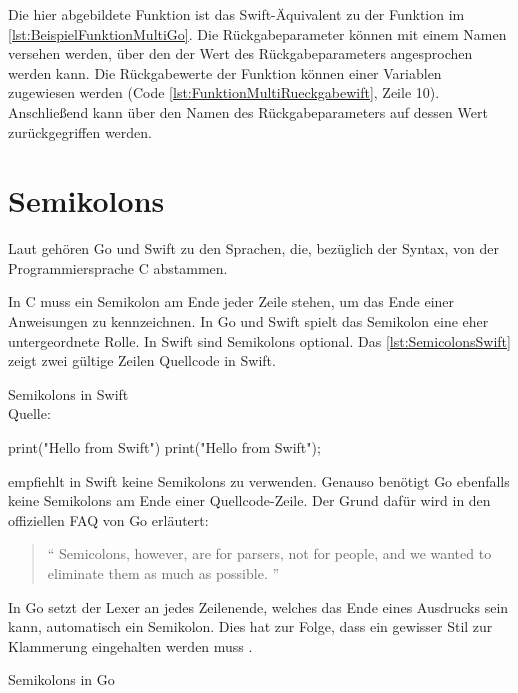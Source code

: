 Die hier abgebildete Funktion ist das Swift-Äquivalent zu der Funktion im \autoref{lst:BeispielFunktionMultiGo}. 
Die Rückgabeparameter können mit einem Namen versehen werden, über den der Wert des Rückgabeparameters angesprochen werden kann. 
Die Rückgabewerte der Funktion können einer Variablen zugewiesen werden (Code \ref{lst:FunktionMultiRueckgabewift}, Zeile 10).
Anschließend kann über den Namen des Rückgabeparameters auf dessen Wert zurückgegriffen werden. 

\section{Semikolons}
\label{sec:Semikolons}
Laut \cite{Wikipedia.ListProgrammingLanguages} gehören Go und Swift zu den Sprachen, die, bezüglich der Syntax, von der Programmiersprache C abstammen.

In C muss ein Semikolon am Ende jeder Zeile stehen, um das Ende einer Anweisungen zu kennzeichnen.
In Go und Swift spielt das Semikolon eine eher untergeordnete Rolle.
In Swift sind Semikolons optional. 
Das \autoref{lst:SemicolonsSwift} zeigt zwei gültige Zeilen Quellcode in Swift.

\begin{listing}[H]
\caption{Semikolons in Swift \\ Quelle:\cite[S.15]{Hoffman.2017}}
\label{lst:SemicolonsSwift}
\begin{SwiftCode}
print("Hello from Swift")
print("Hello from Swift");
\end{SwiftCode}
\end{listing}

\cite{Hoffman.2017} empfiehlt in Swift keine Semikolons zu verwenden. 
Genauso benötigt Go ebenfalls keine Semikolons am Ende einer Quellcode-Zeile. 
Der Grund dafür wird in den offiziellen FAQ von Go erläutert:

\begin{quote}
\enquote{
Semicolons, however, are for parsers, not for people, and we wanted to eliminate them as much as possible.
} \cite{Golang.FAQ}
\end{quote}

In Go setzt der Lexer an jedes Zeilenende, welches das Ende eines Ausdrucks sein kann, automatisch ein Semikolon. 
Dies hat zur Folge, dass ein gewisser Stil zur Klammerung eingehalten werden muss \cite{Golang.FAQ}.

\begin{listing}[H]
\caption{Semikolons in Go}
\label{lst:SemicolonGo}
\begin{GoCode}
package main

func add(a int, b int) (int){
    return a + b
}

func sub(a int, b int) (int)
{
    return a - b
}
//Compiler-Ausgabe: 
//main.go:8: syntax error: unexpected semicolon or newline before {
//Gofmt-Ausgabe:
//8:1: expected declaration, found '{'
\end{GoCode}
\end{listing}

